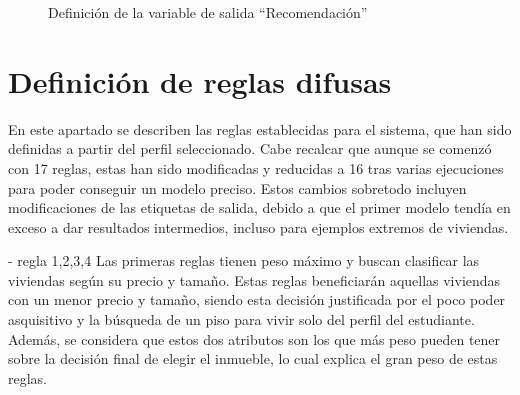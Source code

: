 \documentclass[12pt]{report} %
\begin{document}
    \begin{figure}[H]
        \centering
        \caption{Definición de la variable de salida ``Recomendación''}
    \end{figure}

    \section{Definición de reglas difusas}

    En este apartado se describen las reglas establecidas para el sistema, que
    han sido definidas a partir del perfil seleccionado. Cabe recalcar que
    aunque se comenzó con 17 reglas, estas han sido modificadas y reducidas a
    16 tras varias ejecuciones para poder conseguir un modelo preciso. Estos
    cambios sobretodo incluyen modificaciones de las etiquetas de salida,
    debido a que el primer modelo tendía en exceso a dar resultados intermedios,
    incluso para ejemplos extremos de viviendas.

    - regla 1,2,3,4
    Las primeras reglas tienen peso máximo y buscan clasificar las viviendas según su precio 
    y tamaño. Estas reglas beneficiarán aquellas viviendas con un menor precio y tamaño, siendo 
    esta decisión justificada por el poco poder asquisitivo y la búsqueda de un piso para vivir solo
    del perfil del estudiante. Además, se considera que estos dos atributos son los que más peso 
    pueden tener sobre la decisión final de elegir el inmueble, lo cual explica el gran peso de 
    estas reglas.
\end{document}
